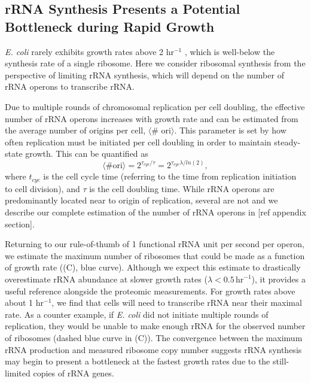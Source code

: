 \subsection{rRNA Synthesis Presents a Potential Bottleneck during Rapid Growth}

\textit{E. coli} rarely exhibits growth rates above 2 hr$^{-1}$
\citep{bremer2008,roller2016}, which is well-below the synthesis rate of a
single ribosome. Here we consider ribosomal synthesis from the perspective of
limiting rRNA synthesis, which will depend on the number of rRNA operons to
transcribe rRNA.

Due to multiple rounds of chromosomal replication per cell doubling, the
effective number of rRNA operons increases with growth rate and can be estimated
from the average number of origins per cell, $\langle$\# ori$\rangle$. This
parameter is set by how often replication must be initiated per cell doubling in
order to maintain steady-state growth. This can be quantified as
\begin{equation}
    \langle \text{\# ori} \rangle = 2^{\tau_{cyc} / \tau} = 2^{\tau_{cyc} \lambda / ln(2)},
    \label{eq:Nori}
\end{equation}
where $t_{cyc}$ is the cell cycle time (referring to the time from replication
initiation to cell division), and $\tau$ is the cell doubling time. While rRNA
operons are predominantly located near to origin of replication, several are not
and we describe our complete estimation of the number of rRNA operons in [ref
appendix section].

Returning to our rule-of-thumb of 1 functional rRNA unit per second per operon,
we estimate the maximum number of ribosomes that could be made as a function of
growth rate ((C), blue curve). Although we expect this
estimate to drastically overestimate rRNA abundance at slower growth rates
($\lambda < 0.5\, \text{hr}^{-1}$), it provides a useful reference alongside the
proteomic measurements. For growth rates above about 1 hr$^{-1}$, we find that
cells will need to transcribe rRNA near their maximal rate. As a counter
example, if \textit{E. coli} did not initiate multiple rounds of replication,
they would be unable to make enough rRNA for the observed number of ribosomes
(dashed blue curve in (C)). The convergence between the
maximum rRNA production and measured ribosome copy number suggests rRNA
synthesis may begin to present a bottleneck at the fastest growth rates due to
the still-limited copies of rRNA genes.


